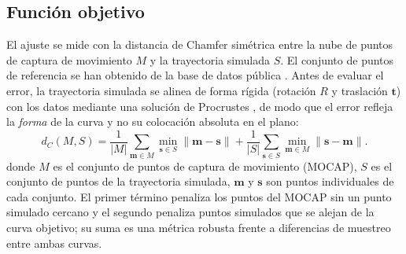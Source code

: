 \documentclass[conference]{IEEEtran}
\begin{document}
\subsection{Función objetivo}
El ajuste se mide con la distancia de Chamfer \cite{ref_chamfer} simétrica entre
la nube de puntos de captura de movimiento $M$ y la trayectoria simulada $S$. El conjunto de puntos de referencia se han obtenido de la base de datos pública \cite{ref_pizzolato}.
Antes de evaluar el error, la trayectoria simulada se alinea de forma rígida
(rotación $R$ y traslación $\mathbf{t}$) con los datos mediante una solución de
Procrustes \cite{ref_procrustes}, de modo que el error refleja la \emph{forma}
de la curva y no su colocación absoluta en el plano:
\begin{equation}
d_C(M,S)=\frac{1}{|M|}\!\sum_{\mathbf{m}\in M}\!\min_{\mathbf{s}\in S}\lVert \mathbf{m}-\mathbf{s}\rVert
+\frac{1}{|S|}\!\sum_{\mathbf{s}\in S}\!\min_{\mathbf{m}\in M}\lVert \mathbf{s}-\mathbf{m}\rVert .
\label{eq:chamfer}
\end{equation}
donde $M$ es el conjunto de puntos de captura de movimiento (MOCAP), $S$ es el
conjunto de puntos de la trayectoria simulada, $\mathbf{m}$ y $\mathbf{s}$ son
puntos individuales de cada conjunto.
El primer término penaliza los puntos del MOCAP sin un punto simulado cercano y
el segundo penaliza puntos simulados que se alejan de la curva objetivo; su suma
es una métrica robusta frente a diferencias de muestreo entre ambas curvas.
\end{document}
